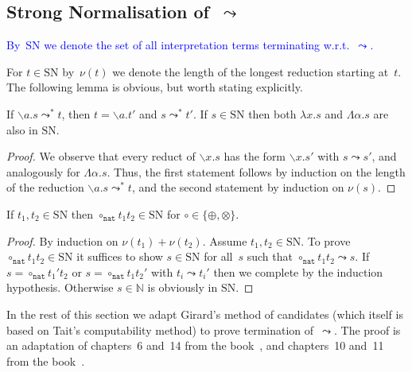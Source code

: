 \documentclass[a4paper,UKenglish,cleveref,autoref,numberwithinsect]{lipics-v2019}
\theoremstyle{definition}
\newcommand{\abstraction}[2]{\backslash #1.#2}
\newcommand{\abs}[2]{\lambda #1.#2}
\newcommand{\tabs}[2]{\Lambda #1.#2}
\newcommand{\arrW}{\leadsto}
\newcommand{\nat}{\mathtt{nat}}
\newcommand{\SN}{\mathrm{SN}}
\newcommand{\CKchange}[1]{\textcolor{blue}{#1}}
\begin{document}
\subsection{Strong Normalisation of~$\arrW$}

\CKchange{By~$\SN$ we denote the set of all interpretation terms terminating
w.r.t.~$\arrW$.}

For $t \in \SN$ by~$\nu(t)$ we denote the length of the longest
reduction starting at~$t$. The following lemma is obvious, but worth
stating explicitly.

\begin{lemma}\label{lem_reduce_abs}
  If $\abstraction{a}{s} \arrW^* t$, then $t = \abstraction{a}{t'}$
  and $s \arrW^* t'$.  If $s \in \SN$ then both $\abs{x}{s}$ and
  $\tabs{\alpha}{s}$ are also in $\SN$.
\end{lemma}

\begin{proof}
  We observe that every reduct of $\abstraction{x}{s}$ has the form
  $\abstraction{x}{s'}$ with $s \arrW s'$, and analogously for
  $\tabs{\alpha}{s}$.  Thus, the first statement follows by induction
  on the length of the reduction $\abstraction{a}{s} \arrW^* t$,
  and the second statement by induction on $\nu(s)$.
\end{proof}

\begin{lemma}\label{lem_circ_sn_base}
  If $t_1,t_2 \in \SN$ then $\circ_\nat t_1 t_2 \in \SN$ for $\circ
  \in \{\oplus,\otimes\}$.
\end{lemma}

\begin{proof}
  By induction on $\nu(t_1) + \nu(t_2)$. Assume $t_1,t_2 \in \SN$. To
  prove $\circ_\nat t_1 t_2 \in \SN$ it suffices to show $s \in \SN$
  for all~$s$ such that $\circ_\nat t_1 t_2 \arrW s$. If $s =
  \circ_\nat t_1' t_2$ or $s = \circ_\nat t_1 t_2'$ with $t_i \arrW
  t_i'$ then we complete by the induction hypothesis. Otherwise $s \in
  \mathbb{N}$ is obviously in $\SN$.
\end{proof}

In the rest of this section we adapt Girard's method of candidates
(which itself is based on Tait's computability method) to prove
termination of~$\arrW$. The proof is an adaptation of chapters~6
and~14 from the book~\cite{Girard1989}, and chapters~10 and~11 from
the book~\cite{SorensenUrzyczyn2006}.
\end{document}
